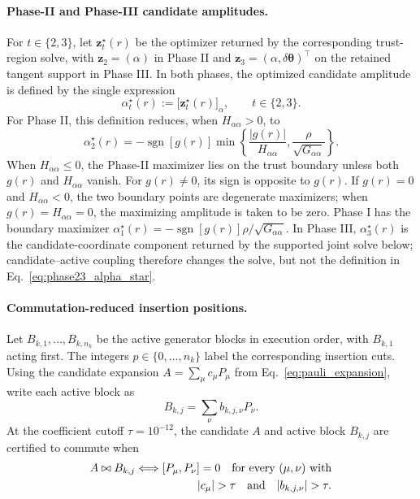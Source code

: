 \documentclass[
  reprint,
  amsmath,
  amssymb,
  aps,
  pra,
  nofootinbib,
  superscriptaddress,
  floatfix
]{revtex4-2}
\begin{document}
\paragraph*{Phase-II and Phase-III candidate amplitudes.}
For \(t\in\{2,3\}\), let \(\mathbf z_t^\star(r)\) be the optimizer returned
by the corresponding trust-region solve, with
\(\mathbf z_2=(\alpha)\) in Phase II and
\(\mathbf z_3=(\alpha,\delta\boldsymbol\theta)^\top\) on the retained
tangent support in Phase III. In both phases, the optimized candidate
amplitude is defined by the single expression
\begin{equation}
\alpha_t^\star(r)
:=
\bigl[\mathbf z_t^\star(r)\bigr]_\alpha,
\qquad t\in\{2,3\}.
\label{eq:phase23_alpha_star}
\end{equation}
For Phase II, this definition reduces, when \(H_{\alpha\alpha}>0\), to
\begin{equation}
\alpha_2^\star(r)
=-\operatorname{sgn}[g(r)]
\min\!\left\{
\frac{|g(r)|}{H_{\alpha\alpha}},
\frac{\rho}{\sqrt{G_{\alpha\alpha}}}
\right\}.
\label{eq:phase2_alpha_star}
\end{equation}
When \(H_{\alpha\alpha}\le0\), the Phase-II maximizer lies on the trust
boundary unless both \(g(r)\) and \(H_{\alpha\alpha}\) vanish. For
\(g(r)\ne0\), its sign is opposite to \(g(r)\). If \(g(r)=0\) and
\(H_{\alpha\alpha}<0\), the two boundary points are degenerate maximizers;
when \(g(r)=H_{\alpha\alpha}=0\), the maximizing amplitude is taken to be
zero. Phase I has the boundary maximizer
\(\alpha_1^\star(r)=-\operatorname{sgn}[g(r)]
\rho/\sqrt{G_{\alpha\alpha}}\). In Phase III,
\(\alpha_3^\star(r)\) is the candidate-coordinate component returned by the
supported joint solve below; candidate--active coupling therefore changes the
solve, but not the definition in Eq.~\eqref{eq:phase23_alpha_star}.

\paragraph*{Commutation-reduced insertion positions.}
Let \(B_{k,1},\ldots,B_{k,n_k}\) be the active generator blocks in execution
order, with \(B_{k,1}\) acting first. The integers
\(p\in\{0,\ldots,n_k\}\) label the corresponding insertion cuts. Using the
candidate expansion \(A=\sum_\mu c_\mu P_\mu\) from
Eq.~\eqref{eq:pauli_expansion}, write each active block as
\begin{equation*}
B_{k,j}
=
\sum_\nu b_{k,j,\nu}P_\nu.
\end{equation*}
At the coefficient cutoff \(\tau=10^{-12}\), the candidate \(A\) and active
block \(B_{k,j}\) are certified to commute when
\begin{equation*}
\begin{aligned}
A\bowtie B_{k,j}
&\Longleftrightarrow [P_\mu,P_\nu]=0
\quad\text{for every }(\mu,\nu)\text{ with}\\
&\hspace{5.5em}|c_\mu|>\tau
\quad\text{and}\quad |b_{k,j,\nu}|>\tau.
\end{aligned}
\end{equation*}
\end{document}
